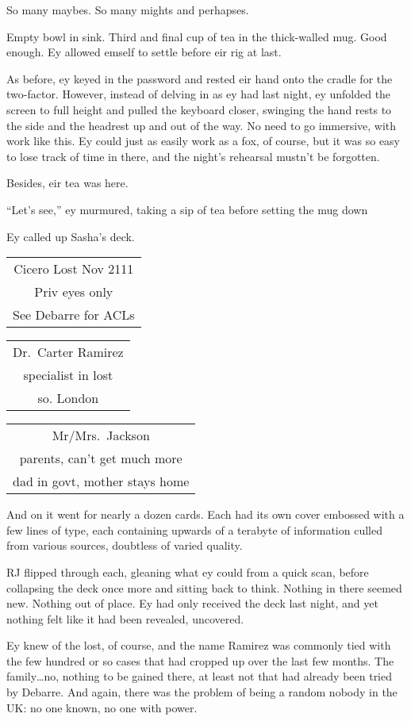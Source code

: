 So many maybes. So many mights and perhapses.

Empty bowl in sink. Third and final cup of tea in the thick-walled mug. Good enough. Ey allowed emself to settle before eir rig at last.

As before, ey keyed in the password and rested eir hand onto the cradle for the two-factor. However, instead of delving in as ey had last night, ey unfolded the screen to full height and pulled the keyboard closer, swinging the hand rests to the side and the headrest up and out of the way. No need to go immersive, with work like this. Ey could just as easily work as a fox, of course, but it was so easy to lose track of time in there, and the night's rehearsal mustn't be forgotten.

Besides, eir tea was here.

``Let's see,'' ey murmured, taking a sip of tea before setting the mug down

Ey called up Sasha's deck.

\begin{longtable}[]{@{}c@{}}
\toprule
\endhead
Cicero Lost Nov 2111\tabularnewline
Priv eyes only\tabularnewline
See Debarre for ACLs\tabularnewline
\bottomrule
\end{longtable}

\begin{longtable}[]{@{}c@{}}
\toprule
\endhead
Dr.~Carter Ramirez\tabularnewline
specialist in lost\tabularnewline
so. London\tabularnewline
\bottomrule
\end{longtable}

\begin{longtable}[]{@{}c@{}}
\toprule
\endhead
Mr/Mrs.~Jackson\tabularnewline
parents, can't get much more\tabularnewline
dad in govt, mother stays home\tabularnewline
\bottomrule
\end{longtable}

And on it went for nearly a dozen cards. Each had its own cover embossed with a few lines of type, each containing upwards of a terabyte of information culled from various sources, doubtless of varied quality.

RJ flipped through each, gleaning what ey could from a quick scan, before collapsing the deck once more and sitting back to think. Nothing in there seemed new. Nothing out of place. Ey had only received the deck last night, and yet nothing felt like it had been revealed, uncovered.

Ey knew of the lost, of course, and the name Ramirez was commonly tied with the few hundred or so cases that had cropped up over the last few months. The family\ldots{}no, nothing to be gained there, at least not that had already been tried by Debarre. And again, there was the problem of being a random nobody in the UK: no one known, no one with power.

